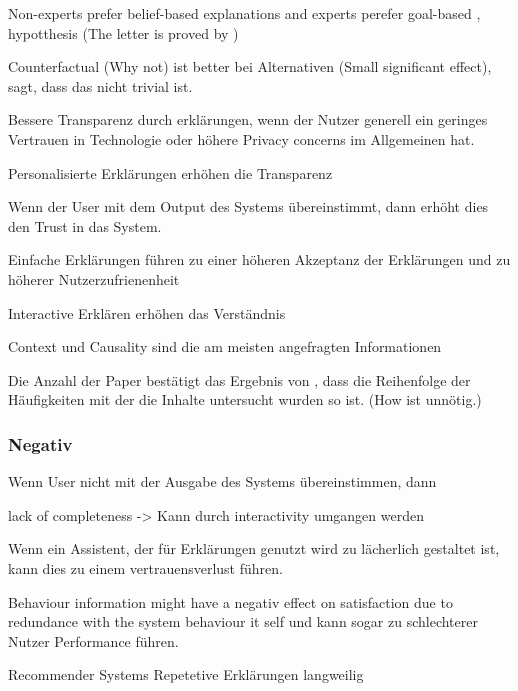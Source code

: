 Non-experts prefer belief-based explanations and experts perefer goal-based \cite{kaptein_personalised_2017}, hypotthesis (The letter is proved by \cite{martin_evaluating_2021})

Counterfactual (Why not) ist better bei Alternativen \cite{martin_evaluating_2021, schrills_color_2020}  \cite{neerincx_using_2018} \cite{schrills_color_2020} (Small significant effect), \cite{lim_2009_assessing} sagt, dass das nicht trivial ist.

Bessere Transparenz durch erklärungen, wenn der Nutzer generell ein geringes Vertrauen in Technologie oder höhere Privacy concerns im Allgemeinen hat. \cite{tsai_effects_2020}

Personalisierte Erklärungen erhöhen die Transparenz \cite{sokol_one_2020, wiegand2019drive}

Wenn der User mit dem Output des Systems übereinstimmt, dann erhöht dies den Trust in das System. \cite{schrills_color_2020}

Einfache Erklärungen führen zu einer höheren Akzeptanz der Erklärungen und zu höherer Nutzerzufrienenheit \cite{hleg2019policy, sovrano_modelling_2020}

Interactive Erklären erhöhen das Verständnis \cite{cheng2019explaining}

Context und Causality sind die am meisten angefragten Informationen \cite{chazette_end-users_nodate}

Die Anzahl der Paper bestätigt das Ergebnis von \cite{chazette_end-users_nodate}, dass die Reihenfolge der Häufigkeiten mit der die Inhalte untersucht wurden so ist. (How ist unnötig.)

\subsubsection*{Negativ}

Wenn User nicht mit der Ausgabe des Systems übereinstimmen, dann 

lack of completeness \cite{chazette_end-users_nodate} -> Kann durch interactivity umgangen werden

Wenn ein Assistent, der für Erklärungen genutzt wird zu lächerlich gestaltet ist, kann dies zu einem vertrauensverlust führen. \cite{wang_is_2018}

Behaviour information might have a negativ effect on satisfaction due to redundance with the system behaviour it self und kann sogar zu schlechterer Nutzer Performance führen. \cite{koo_why_2015}

Recommender Systems Repetetive Erklärungen \glqq langweilig\grqq{}

